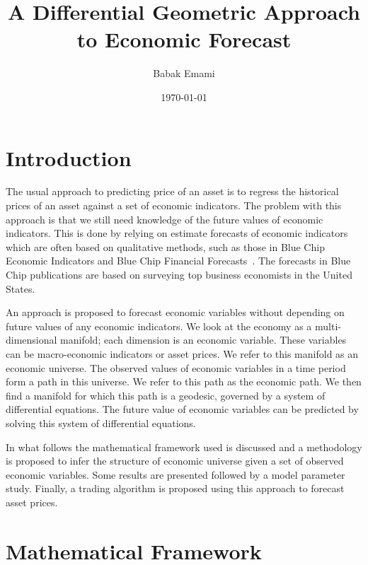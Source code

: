 \documentclass{article}
\title{A Differential Geometric Approach to Economic Forecast}
\author{Babak Emami}
\date{\today}
\begin{document}
\maketitle

\begin{abstract}


\end{abstract}

\section{Introduction}\label{section:introduction}

The usual approach to predicting price of an asset is to regress the
historical prices of an asset against a set of economic
indicators. The problem with this approach is that we still need
knowledge of the future values of economic indicators. This is done by
relying on estimate forecasts of economic indicators which are often
based on qualitative methods, such as those in Blue Chip Economic
Indicators and Blue Chip Financial Forecasts~\cite{ref:blue-chip}. The
forecasts in Blue Chip publications are based on surveying top
business economists in the United States.

An approach is proposed to forecast economic variables without
depending on future values of any economic indicators. We look at the
economy as a multi-dimensional manifold; each dimension is an economic
variable. These variables can be macro-economic indicators or asset
prices. We refer to this manifold as an economic universe. The
observed values of economic variables in a time period form a path in
this universe. We refer to this path as the economic path. We then
find a manifold for which this path is a geodesic, governed by a
system of differential equations. The future value of economic
variables can be predicted by solving this system of differential
equations.

In what follows the mathematical framework used is discussed and a
methodology is proposed to infer the structure of economic universe
given a set of observed economic variables. Some results are presented
followed by a model parameter study. Finally, a trading algorithm is
proposed using this approach to forecast asset prices.

\section{Mathematical Framework}\label{section:mathematical-framework}
\end{document}
